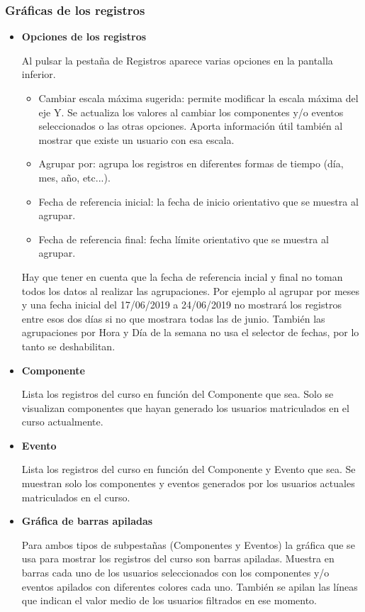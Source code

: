 \subsubsection{Gráficas de los registros}

\begin{itemize}
	\item \textbf{Opciones de los registros}
	
	Al pulsar la pestaña de Registros aparece varias opciones en la pantalla inferior.
	\begin{itemize}
		\item Cambiar escala máxima sugerida: permite modificar la escala máxima del eje Y. Se actualiza los valores al cambiar los componentes y/o eventos seleccionados o  las otras opciones. Aporta información útil también al mostrar que existe un usuario con esa escala.
		\item Agrupar por: agrupa los registros en diferentes formas de tiempo (día, mes, año, etc...). 
		\item Fecha de referencia inicial: la fecha de inicio orientativo que se muestra al agrupar.
		\item Fecha de referencia final:  fecha límite orientativo que se muestra al agrupar.
	\end{itemize}
	Hay que tener en cuenta que la fecha de referencia  incial y final no toman todos los datos al realizar las agrupaciones. Por ejemplo al agrupar por meses y una fecha inicial del 17/06/2019 a 24/06/2019 no mostrará los registros entre esos dos días si no que mostrara todas las de junio.
	También las agrupaciones por Hora y Día de la semana no usa el selector de fechas, por lo tanto se deshabilitan.
	
	\item \textbf{Componente}
	
	Lista los registros del curso en función del Componente que sea. Solo se visualizan componentes que hayan generado los usuarios matriculados en el curso actualmente.
	
	\item \textbf{Evento}
	
	Lista los registros del curso en función del Componente y Evento que sea. Se muestran solo los componentes y eventos generados por los usuarios actuales matriculados en el curso. 
	
	\item \textbf{Gráfica de barras apiladas}
	
	Para ambos tipos de subpestañas (Componentes y Eventos)  la gráfica que se usa para mostrar los registros del curso son barras apiladas. Muestra en barras cada uno de los usuarios seleccionados con los componentes y/o eventos apilados con diferentes colores cada uno. También se apilan las líneas que indican el valor medio de los usuarios filtrados en ese momento.
\end{itemize}
